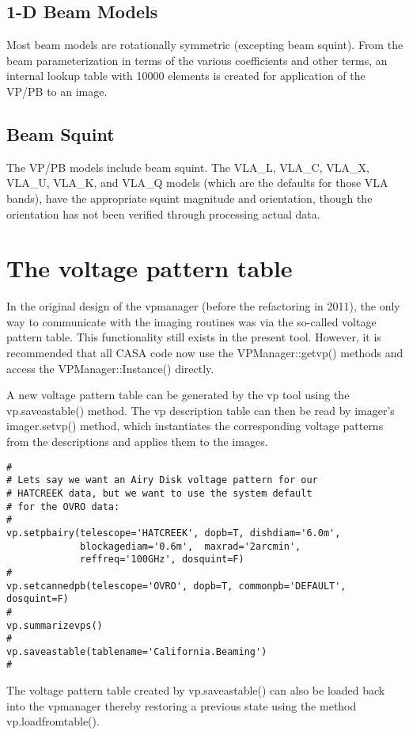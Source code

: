\documentclass[12pt]{article}
\begin{document}
\subsection{1-D Beam Models} 
Most beam models are rotationally symmetric (excepting
beam squint).  From the beam parameterization in terms of the various
coefficients and other terms, an internal lookup table with 10000 elements is
created for application of the VP/PB to an image.

\subsection{Beam Squint} The VP/PB models include beam squint.  The VLA\_L,
VLA\_C, VLA\_X, VLA\_U, VLA\_K, and VLA\_Q models (which are the defaults for
those VLA bands), have the appropriate squint magnitude and orientation, though
the orientation has not been verified through processing actual data.

\section{The voltage pattern table}
\label{secvp}

In the original design of the vpmanager (before the refactoring in 2011),
the only way to communicate with the imaging routines was via the so-called
voltage pattern table. This functionality still exists in the present tool.
However, it is recommended that all CASA code now use the VPManager::getvp()
methods and access the VPManager::Instance() directly.

A new voltage pattern table can be generated by the vp tool using the vp.saveastable()
method.  The vp description table can then be read by imager's
imager.setvp() method, which instantiates the
corresponding voltage patterns from the descriptions and applies them
to the images.

\begin{verbatim}
#
# Lets say we want an Airy Disk voltage pattern for our
# HATCREEK data, but we want to use the system default
# for the OVRO data:
#
vp.setpbairy(telescope='HATCREEK', dopb=T, dishdiam='6.0m',
             blockagediam='0.6m',  maxrad='2arcmin',
             reffreq='100GHz', dosquint=F)
#
vp.setcannedpb(telescope='OVRO', dopb=T, commonpb='DEFAULT', dosquint=F)
#
vp.summarizevps()
#
vp.saveastable(tablename='California.Beaming')
#
\end{verbatim}

The voltage pattern table created by vp.saveastable() can also
be loaded back into the vpmanager thereby restoring a previous state
using the method vp.loadfromtable().
\end{document}
